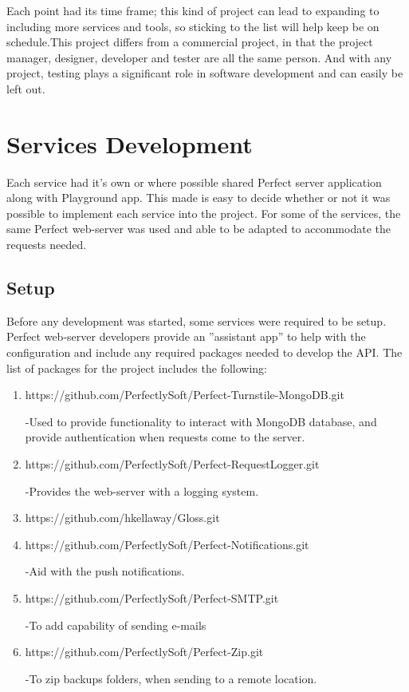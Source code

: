 Each point had its time frame; this kind of project can lead to expanding to including more services and tools, so sticking to the list will help keep be on schedule.This project differs from a commercial project, in that the project manager, designer, developer and tester are all the same person. And with any project, testing plays a significant role in software development and can easily be left out.

\section{Services Development}

Each service had it's own or where possible shared Perfect server application along with Playground app. This made is easy to decide whether or not it was possible to implement each service into the project. For some of the services, the same Perfect web-server was used and able to be adapted to accommodate the requests needed. 

\subsection{Setup} 

Before any development was started, some services were required to be setup. Perfect web-server developers provide an ”assistant app” to help with the configuration and include any required packages needed to develop the API. The list of packages for the project includes the following:

\begin{enumerate}
  \item https://github.com/PerfectlySoft/Perfect-Turnstile-MongoDB.git
  
  -Used to provide functionality to interact with MongoDB database, and provide authentication when requests come to the server.
  \item https://github.com/PerfectlySoft/Perfect-RequestLogger.git
  
  -Provides the web-server with a logging system.
  \item https://github.com/hkellaway/Gloss.git
  \item https://github.com/PerfectlySoft/Perfect-Notifications.git
  
  -Aid with the push notifications.
  \item https://github.com/PerfectlySoft/Perfect-SMTP.git
  
  -To add capability of sending e-mails
  \item https://github.com/PerfectlySoft/Perfect-Zip.git
  
  -To zip backups folders, when sending to a remote location.
\end{enumerate}

